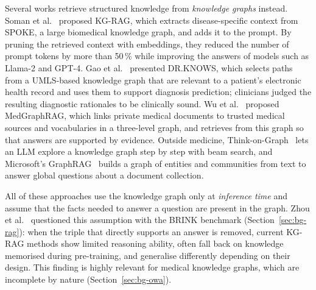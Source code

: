 Several works retrieve structured knowledge from \emph{knowledge graphs}
instead. Soman et al.~\cite{soman2024biomedical} proposed KG-RAG, which
extracts disease-specific context from SPOKE, a large biomedical knowledge
graph, and adds it to the prompt. By pruning the retrieved context with
embeddings, they reduced the number of prompt tokens by more than 50\,\%
while improving the answers of models such as Llama-2 and GPT-4. Gao et
al.~\cite{gao2025leveraging} presented DR.KNOWS, which selects paths from a
UMLS-based knowledge graph that are relevant to a patient's electronic health
record and uses them to support diagnosis prediction; clinicians judged the
resulting diagnostic rationales to be clinically sound. Wu et
al.~\cite{wu2025medical} proposed MedGraphRAG, which links private medical
documents to trusted medical sources and vocabularies in a three-level graph,
and retrieves from this graph so that answers are supported by evidence.
Outside medicine, Think-on-Graph~\cite{sun2024thinkongraph} lets an LLM
explore a knowledge graph step by step with beam search, and Microsoft's
GraphRAG~\cite{edge2024local} builds a graph of entities and communities from
text to answer global questions about a document collection.

All of these approaches use the knowledge graph only at \emph{inference
time} and assume that the facts needed to answer a question are present in
the graph. Zhou et al.~\cite{zhou2026breaks} questioned this assumption with
the BRINK benchmark (Section~\ref{sec:bg-rag}): when the triple that directly
supports an answer is removed, current KG-RAG methods show limited reasoning
ability, often fall back on knowledge memorised during pre-training, and
generalise differently depending on their design. This finding is highly
relevant for medical knowledge graphs, which are incomplete by nature
(Section~\ref{sec:bg-owa}).

